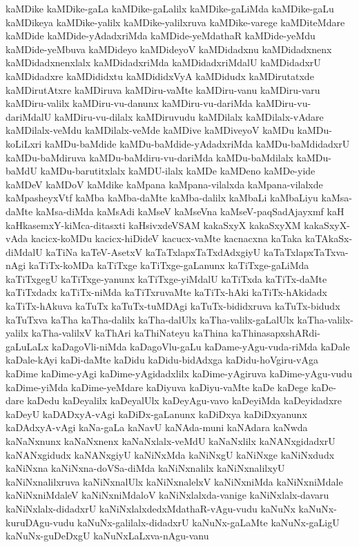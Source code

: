 {kaMDike
kaMDike-gaLa
kaMDike-gaLalilx
kaMDike-gaLiMda
kaMDike-gaLu
kaMDikeya
kaMDike-yalilx
kaMDike-yalilxruva
kaMDike-varege
kaMDiteMdare
kaMDide
kaMDide-yAdadxriMda
kaMDide-yeMdathaR
kaMDide-yeMdu
kaMDide-yeMbuva
kaMDideyo
kaMDideyoV
kaMDidadxnu
kaMDidadxnenx
kaMDidadxnenxlalx
kaMDidadxriMda
kaMDidadxriMdalU
kaMDidadxrU
kaMDidadxre
kaMDididxtu
kaMDididxVyA
kaMDidudx
kaMDirutatxde
kaMDirutAtxre
kaMDiruva
kaMDiru-vaMte
kaMDiru-vanu
kaMDiru-varu
kaMDiru-valilx
kaMDiru-vu-danunx
kaMDiru-vu-dariMda
kaMDiru-vu-dariMdalU
kaMDiru-vu-dilalx
kaMDiruvudu
kaMDilalx
kaMDilalx-vAdare
kaMDilalx-veMdu
kaMDilalx-veMde
kaMDive
kaMDiveyoV
kaMDu
kaMDu-koLiLxri
kaMDu-baMdide
kaMDu-baMdide-yAdadxriMda
kaMDu-baMdidadxrU
kaMDu-baMdiruva
kaMDu-baMdiru-vu-dariMda
kaMDu-baMdilalx
kaMDu-baMdU
kaMDu-barutitxlalx
kaMDU-ilalx
kaMDe
kaMDeno
kaMDe-yide
kaMDeV
kaMDoV
kaMdike
kaMpana
kaMpana-vilalxda
kaMpana-vilalxde
kaMpasheyxVtf
kaMba
kaMba-daMte
kaMba-dalilx
kaMbaLi
kaMbaLiyu
kaMsa-daMte
kaMsa-diMda
kaMsAdi
kaMseV
kaMseVna
kaMseV-paqSadAjayxmf
kaH
kaHkasemxY-kiMca-ditasxti
kaHsivxdeVSAM
kakaSxyX
kakaSxyXM
kakaSxyX-vAda
kacicx-koMDu
kacicx-hiDideV
kacucx-vaMte
kacnacxna
kaTaka
kaTAkaSx-diMdalU
kaTiNa
kaTeV-AsetxV
kaTaTxlapxTaTxdAdxgiyU
kaTaTxlapxTaTxva-nAgi
kaTiTx-koMDa
kaTiTxge
kaTiTxge-gaLanunx
kaTiTxge-gaLiMda
kaTiTxgegU
kaTiTxge-yanunx
kaTiTxge-yiMdalU
kaTiTxda
kaTiTx-daMte
kaTiTxdadx
kaTiTx-niMda
kaTiTxruvaMte
kaTiTx-hAki
kaTiTx-hAkidadx
kaTiTx-hAkuva
kaTuTx
kaTuTx-tuMDAgi
kaTuTx-bididxruva
kaTuTx-bidudx
kaTuTxva
kaTha
kaTha-dalilx
kaTha-dalUlx
kaTha-valilx-gaLalUlx
kaTha-valilx-yalilx
kaTha-valilxV
kaThAri
kaThiNateyu
kaThina
kaThinasapxshARdi-gaLuLaLx
kaDagoVli-niMda
kaDagoVlu-gaLu
kaDame-yAgu-vuda-riMda
kaDale
kaDale-kAyi
kaDi-daMte
kaDidu
kaDidu-bidAdxga
kaDidu-hoVgiru-vAga
kaDime
kaDime-yAgi
kaDime-yAgidadxlilx
kaDime-yAgiruva
kaDime-yAgu-vudu
kaDime-yiMda
kaDime-yeMdare
kaDiyuva
kaDiyu-vaMte
kaDe
kaDege
kaDe-dare
kaDedu
kaDeyalilx
kaDeyalUlx
kaDeyAgu-vavo
kaDeyiMda
kaDeyidadxre
kaDeyU
kaDADxyA-vAgi
kaDiDx-gaLanunx
kaDiDxya
kaDiDxyanunx
kaDAdxyA-vAgi
kaNa-gaLa
kaNavU
kaNAda-muni
kaNAdara
kaNwda
kaNaNxnunx
kaNaNxnenx
kaNaNxlalx-veMdU
kaNaNxlilx
kaNANxgidadxrU
kaNANxgidudx
kaNANxgiyU
kaNiNxMda
kaNiNxgU
kaNiNxge
kaNiNxdudx
kaNiNxna
kaNiNxna-doVSa-diMda
kaNiNxnalilx
kaNiNxnalilxyU
kaNiNxnalilxruva
kaNiNxnalUlx
kaNiNxnalelxV
kaNiNxniMda
kaNiNxniMdale
kaNiNxniMdaleV
kaNiNxniMdaloV
kaNiNxlalxda-vanige
kaNiNxlalx-davaru
kaNiNxlalx-didadxrU
kaNiNxlalxdedxMdathaR-vAgu-vudu
kaNuNx
kaNuNx-kuruDAgu-vudu
kaNuNx-galilalx-didadxrU
kaNuNx-gaLaMte
kaNuNx-gaLigU
kaNuNx-guDeDxgU
kaNuNxLaLxva-nAgu-vanu
}
